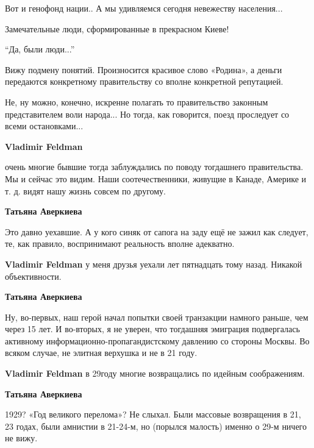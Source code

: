 \begin{itemize}
\begin{itemize}
\end{itemize} %

Вот и генофонд нации..
А мы удивляемся сегодня невежеству населения...

Замечательные люди, сформированные в прекрасном Киеве!

\enquote{Да, были люди...}


Вижу подмену понятий. Произносится красивое слово «Родина», а деньги передаются
конкретному правительству со вполне конкретной репутацией.

Не, ну можно, конечно, искренне полагать то правительство законным
представителем воли народа... Но тогда, как говорится, поезд проследует со всеми
остановками...

\begin{itemize} %
\textbf{Vladimir Feldman} 

очень многие бывшие тогда заблуждались по поводу тогдашнего правительства. Мы и
сейчас это видим. Наши соотечественники, живущие в Канаде, Америке и т. д. видят
нашу жизнь совсем по другому.


\textbf{Татьяна Аверкиева} 

Это давно уехавшие. А у кого синяк от сапога на заду ещё не зажил как следует,
те, как правило, воспринимают реальность вполне адекватно.

\textbf{Vladimir Feldman} у меня друзья уехали лет пятнадцать тому назад. Никакой объективности.

\begin{itemize} %
\textbf{Татьяна Аверкиева} 

Ну, во-первых, наш герой начал попытки своей транзакции намного раньше, чем
через 15 лет. И во-вторых, я не уверен, что тогдашняя эмиграция подвергалась
активному информационно-пропагандистскому давлению со стороны Москвы. Во всяком
случае, не элитная верхушка и не в 21 году.

\end{itemize} %

\textbf{Vladimir Feldman} в 29году многие возвращались по идейным соображениям.

\begin{itemize} %
\textbf{Татьяна Аверкиева} 

1929? «Год великого перелома»? Не слыхал. Были массовые возвращения в 21, 23
годах, были амнистии в 21-24-м, но (порылся малость) именно о 29-м ничего не
вижу.


\end{itemize}
\end{itemize}
\end{itemize}
